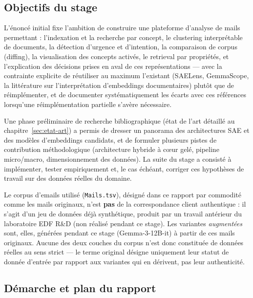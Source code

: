 \documentclass[11pt]{article}
\begin{document}
\subsection{Objectifs du stage}

L'énoncé initial fixe l'ambition de construire une plateforme d'analyse de
mails permettant : l'indexation et la recherche par concept, le clustering
interprétable de documents, la détection d'urgence et d'intention, la
comparaison de corpus (diffing), la visualisation des concepts activés, le
retrieval par propriétés, et l'explication des décisions prises en aval de ces
représentations --- avec la contrainte explicite de réutiliser au maximum
l'existant (SAELens, GemmaScope, la littérature sur l'interprétation
d'embeddings documentaires) plutôt que de réimplémenter, et de documenter
systématiquement les écarts avec ces références lorsqu'une réimplémentation
partielle s'avère nécessaire.

Une phase préliminaire de recherche bibliographique (état de l'art détaillé au
chapitre~\ref{sec:etat-art}) a permis de dresser un panorama des architectures
SAE et des modèles d'embeddings candidats, et de formuler plusieurs pistes de
contribution méthodologique (architecture hybride à cœur gelé, pipeline
micro/macro, dimensionnement des données). La suite du stage a consisté à
implémenter, tester empiriquement et, le cas échéant, corriger ces
hypothèses de travail sur des données réelles du domaine.

\begin{definitionbox}
Le corpus d'emails utilisé (\texttt{Mails.tsv}), désigné dans ce rapport par
commodité comme les mails \og{}originaux\fg{}, n'est \textbf{pas} de la
correspondance client authentique : il s'agit d'un jeu de données déjà
synthétique, produit par un travail antérieur du laboratoire EDF R\&D (non
réalisé pendant ce stage). Les variantes \emph{augmentées} sont, elles,
générées pendant ce stage (Gemma-3-12B-it) à partir de ces mails
\og{}originaux\fg{}. Aucune des deux couches du corpus n'est donc constituée
de données réelles au sens strict --- le terme \og{}original\fg{} désigne
uniquement leur statut de donnée d'entrée par rapport aux variantes qui en
dérivent, pas leur authenticité.
\end{definitionbox}

\subsection{Démarche et plan du rapport}
\end{document}
